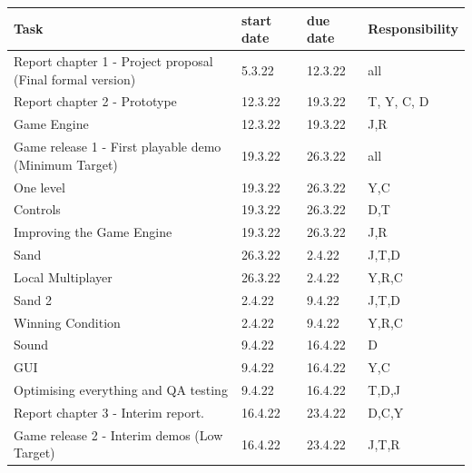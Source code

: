 \begingroup
\small
\begin{tabular}{|l|l|l|l|} 
\hline
Task                                                          & start date & due date & Responsibility  \\ 
\hline
Report chapter 1 - Project proposal (Final formal version)    & 5.3.22     & 12.3.22  & all             \\
Report chapter 2 - Prototype                                  & 12.3.22    & 19.3.22  & T, Y, C, D      \\
Game Engine                                                   & 12.3.22    & 19.3.22  & J,R             \\
Game release 1 - First playable demo (Minimum Target)         & 19.3.22    & 26.3.22  & all             \\
One level                                                     & 19.3.22    & 26.3.22  & Y,C             \\
Controls                                                      & 19.3.22    & 26.3.22  & D,T             \\
Improving the Game Engine                                     & 19.3.22    & 26.3.22  & J,R             \\
Sand                                                          & 26.3.22    & 2.4.22   & J,T,D           \\
Local Multiplayer                                             & 26.3.22    & 2.4.22   & Y,R,C           \\
Sand 2                                                        & 2.4.22     & 9.4.22   & J,T,D           \\
Winning Condition                                             & 2.4.22     & 9.4.22   & Y,R,C           \\
Sound                                                         & 9.4.22     & 16.4.22  & D               \\
GUI                                                           & 9.4.22     & 16.4.22  & Y,C             \\
Optimising everything and QA testing                          & 9.4.22     & 16.4.22  & T,D,J           \\
Report chapter 3 - Interim report.                            & 16.4.22    & 23.4.22  & D,C,Y           \\
Game release 2 - Interim demos (Low Target)                   & 16.4.22    & 23.4.22  & J,T,R           \\

\end{tabular}
